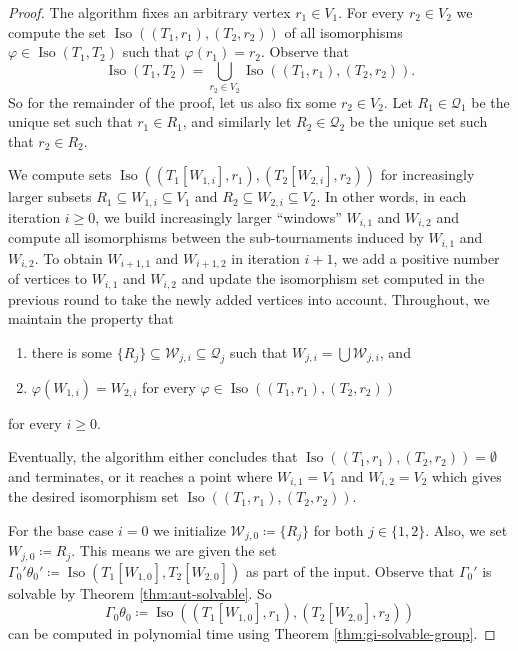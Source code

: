 \documentclass{theoretics}
\newcommand{\CQ}{{\mathcal Q}}
\newcommand{\CW}{{\mathcal W}}
\DeclareMathOperator{\Iso}{Iso}
\begin{document}
\begin{proof}
 The algorithm fixes an arbitrary vertex $r_1 \in V_1$.
 For every $r_2 \in V_2$ we compute the set $\Iso((T_1,r_1),(T_2,r_2))$ of all isomorphisms $\varphi \in \Iso(T_1,T_2)$ such that $\varphi(r_1) = r_2$.
 Observe that
 \[\Iso(T_1,T_2) = \bigcup_{r_2 \in V_2} \Iso((T_1,r_1),(T_2,r_2)).\]
 So for the remainder of the proof, let us also fix some $r_2 \in V_2$.
 Let $R_1 \in \CQ_1$ be the unique set such that $r_1 \in R_1$, and similarly let $R_2 \in \CQ_2$ be the unique set such that $r_2 \in R_2$.

 We compute sets $\Iso((T_1[W_{1,i}],r_1),(T_2[W_{2,i}],r_2))$ for increasingly larger subsets $R_1 \subseteq W_{1,i} \subseteq V_1$ and $R_2 \subseteq W_{2,i} \subseteq V_2$.
 In other words, in each iteration $i \geq 0$, we build increasingly larger ``windows'' $W_{i,1}$ and $W_{i,2}$ and compute all isomorphisms between the sub-tournaments induced by $W_{i,1}$ and $W_{i,2}$.
 To obtain $W_{i+1,1}$ and $W_{i+1,2}$ in iteration $i+1$, we add a positive number of vertices to $W_{i,1}$ and $W_{i,2}$ and update the isomorphism set computed in the previous round to take the newly added vertices into account.
 Throughout, we maintain the property that
 \begin{enumerate}[label = (I.\arabic*),leftmargin=*]
  \item\label{item:invariant-1} there is some $\{R_j\} \subseteq \CW_{j,i} \subseteq \CQ_j$ such that $W_{j,i} = \bigcup \CW_{j,i}$, and
  \item\label{item:invariant-2} $\varphi(W_{1,i}) = W_{2,i}$ for every $\varphi \in \Iso((T_1,r_1),(T_2,r_2))$
 \end{enumerate}
 for every $i \geq 0$.

 Eventually, the algorithm either concludes that $\Iso((T_1,r_1),(T_2,r_2)) = \emptyset$ and terminates, or it reaches a point where $W_{i,1} = V_1$ and $W_{i,2} = V_2$ which gives the desired isomorphism set $\Iso((T_1,r_1),(T_2,r_2))$.

 For the base case $i = 0$ we initialize $\CW_{j,0} \coloneqq \{R_j\}$ for both $j \in \{1,2\}$.
 Also, we set $W_{j,0} \coloneqq R_j$.
 This means we are given the set $\Gamma_0'\theta_0' \coloneqq \Iso(T_1[W_{1,0}],T_2[W_{2,0}])$ as part of the input.
 Observe that $\Gamma_0'$ is solvable by Theorem \ref{thm:aut-solvable}.
 So
 \[\Gamma_0\theta_0 \coloneqq \Iso((T_1[W_{1,0}],r_1),(T_2[W_{2,0}],r_2))\]
 can be computed in polynomial time using Theorem \ref{thm:gi-solvable-group}.


\end{proof}
\end{document}
